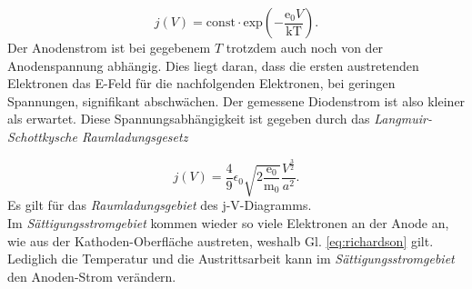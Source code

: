 \begin{equation}
j(V) = \mathrm{const}  \cdot \mathrm{exp} ( - \frac{ \mathrm{e_0} V}  { \mathrm{kT}} ).
\label{eq:anlauf}
\end{equation}
Der Anodenstrom ist bei gegebenem $T$ trotzdem auch noch von der Anodenspannung abhängig. Dies liegt daran, dass die ersten austretenden Elektronen das E-Feld für die nachfolgenden
Elektronen, bei geringen Spannungen, signifikant abschwächen. Der gemessene Diodenstrom ist also kleiner als erwartet.
Diese Spannungsabhängigkeit ist gegeben durch das \textit{Langmuir-Schottkysche Raumladungsgesetz} \cite{sample}

\begin{equation}
j(V) = \frac{4}{9} \epsilon_0 \sqrt{2 \frac{\mathrm{e_0}}{\mathrm{m_0}} } \frac{V^{\frac{3}{2}}}{a^2}.
\label{eq:langmuir}
\end{equation}
Es gilt für das \textit{Raumladungsgebiet} des j-V-Diagramms. \\
\newline
Im \textit{Sättigungsstromgebiet} kommen wieder so viele Elektronen an der Anode an, wie aus der Kathoden-Oberfläche austreten, weshalb Gl. \eqref{eq:richardson} gilt. Lediglich die Temperatur und die Austrittsarbeit kann im \textit{Sättigungsstromgebiet} den Anoden-Strom verändern.